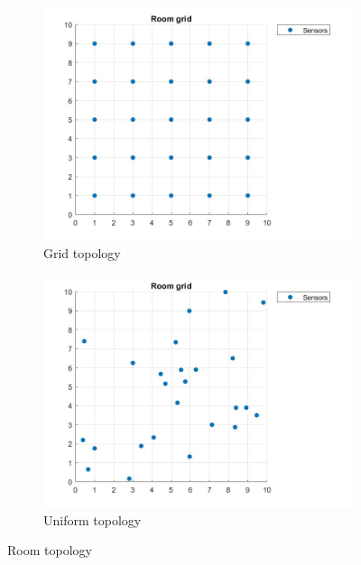 \begin{figure}
    \begin{subfigure}{0.45\textwidth}
        \centering
        \includegraphics[width=\textwidth]{img/room_grid.jpg}
        \caption{Grid topology}
    \end{subfigure}
    \hfill
    \begin{subfigure}{0.45\textwidth}
        \centering
        \includegraphics[width=\textwidth]{img/room_uniform.jpg}
        \caption{Uniform topology}
    \end{subfigure}
    \caption{Room topology}
\end{figure}